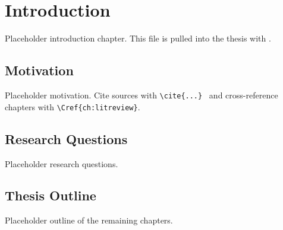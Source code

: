 \chapter{Introduction}
\label{ch:introduction}

Placeholder introduction chapter. This file is pulled into the thesis with
\verb||.

\section{Motivation}
\label{sec:motivation}
Placeholder motivation. Cite sources with \verb|\cite{...}|~\cite{placeholder-thesis}
and cross-reference chapters with \verb|\Cref{ch:litreview}|.

\section{Research Questions}
\label{sec:research-questions}
Placeholder research questions.

\section{Thesis Outline}
\label{sec:outline}
Placeholder outline of the remaining chapters.
